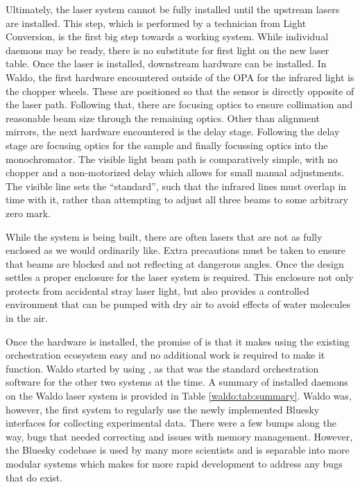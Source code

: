 Ultimately, the laser system cannot be fully installed until the upstream lasers are installed.
This step, which is performed by a technician from Light Conversion, is the first big step towards a working system.
While individual daemons may be ready, there is no substitute for first light on the new laser table.
Once the laser is installed, downstream hardware can be installed.
In Waldo, the first hardware encountered outside of the OPA for the infrared light is the chopper wheels.
These are positioned so that the sensor is directly opposite of the laser path.
Following that, there are focusing optics to ensure collimation and reasonable beam size through the remaining optics.
Other than alignment mirrors, the next hardware encountered is the delay stage.
Following the delay stage are focusing optics for the sample and finally focussing optics into the monochromator.
The visible light beam path is comparatively simple, with no chopper and a non-motorized delay which allows for small manual adjustments.
The visible line sets the ``standard'', such that the infrared lines must overlap in time with it, rather than attempting to adjust all three beams to some arbitrary zero mark.

While the system is being built, there are often lasers that are not as fully enclosed as we would ordinarily like.
Extra precautions must be taken to ensure that beams are blocked and not reflecting at dangerous angles.
Once the design settles a proper enclosure for the laser system is required.
This enclosure not only protects from accidental stray laser light, but also provides a controlled environment that can be pumped with dry air to avoid effects of water molecules in the air.

Once the hardware is installed, the promise of \yaq{} is that it makes using the existing orchestration ecosystem easy and no additional work is required to make it function.
Waldo started by using \yaqccmds{}, as that was the standard orchestration software for the other two systems at the time.
A summary of installed \yaq{} daemons on the Waldo laser system is provided in Table \ref{waldo:tab:summary}.
Waldo was, however, the first system to regularly use the newly implemented Bluesky interfaces for collecting experimental data.
There were a few bumps along the way, bugs that needed correcting and issues with memory management.
However, the Bluesky codebase is used by many more scientists and is separable into more modular systems which makes for more rapid development to address any bugs that do exist.

